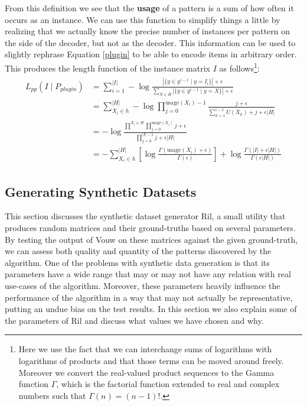 \documentclass{llncs}
\begin{document}
From this definition we see that the \textbf{usage} of a pattern is a sum of how often it occurs as an instance. We can use this function to simplify things a little by realizing that we actually know the precise number of instances per pattern on the side of the decoder, but not as the decoder. This information can be used to slightly rephrase Equation \ref{plugin} to be able to encode items in arbitrary order. This produces the length function of the instance matrix ${I}$ as follows\footnote{Here we use the fact that we can interchange sums of logarithms with logarithms of products and that those terms can be moved around freely. Moreover we convert the real-valued product sequences to the Gamma function $\Gamma$, which is the factorial function extended to real and complex numbers such that $\Gamma(n) = (n-1)!$.}:
\begin{align}
\begin{split}
	L_{pp}({I}\mid P_{plugin}) &= \sum^{|{I}|}_{i=1} -\log \frac{|\{y \in y^{i-1} \mid y = {I}_i\}| + \epsilon }{\sum_{X \in H}|\{y \in y^{i-1} \mid y = X\}| + \epsilon}\\
	&= \sum^{|H|}_{X_i \in h} -\log \prod^{\mathrm{usage}(X_i)-1}_{j=0} \frac{j+\epsilon}{\sum^{i-1}_{k=1} U(X_k)+j+\epsilon|H|} \\
	&= -\log \frac{\prod^{X_i\in H} \prod^{\mathrm{usage}(X_i)}_{j=0} j + \epsilon}{\prod^{|{I}|-1}_{j=0} j + \epsilon|H|} \\
	&= -\sum^{|H|}_{X_i \in h} \left[ \log \frac{\Gamma(\mathrm{usage}(X_i)+\epsilon)}{\Gamma(\epsilon)}\right] + \log \frac{\Gamma(|{I}| + \epsilon|H|)}{\Gamma(\epsilon|H|)}
\end{split}
\end{align}


\subsection{Generating Synthetic Datasets}

This section discusses the synthetic dataset generator Ril, a small utility that produces random matrices and their ground-truths based on several parameters. By testing the output of Vouw on these matrices against the given ground-truth, we can assess both quality and quantity of the patterns discovered by the algorithm. One of the problems with synthetic data generation is that its parameters have a wide range that may or may not have any relation with real use-cases of the algorithm. Moreover, these parameters heavily influence the performance of the algorithm in a way that may not actually be representative, putting an undue bias on the test results. In this section we also explain some of the parameters of Ril and discuss what values we have chosen and why.
\end{document}
